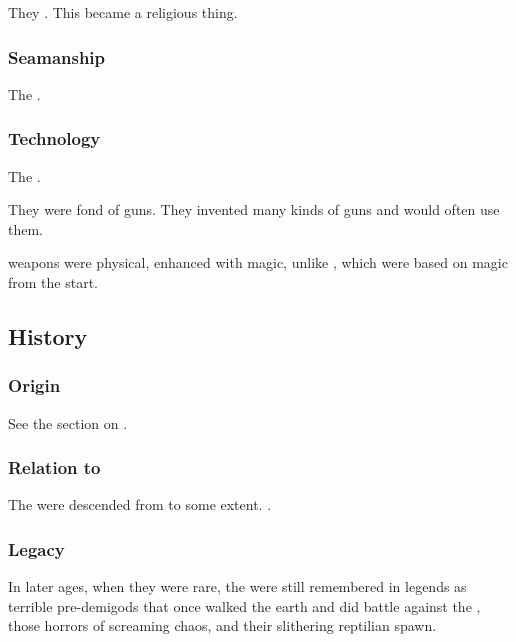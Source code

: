 They . 
This became a religious thing. 






\subsubsection{Seamanship}
The \aryothim{} . 





\subsubsection{Technology}
The \aryothim {}. 

They were fond of guns. 
They invented many kinds of guns and would often use them. 

\Aryoth{} weapons were physical, enhanced with magic, unlike , which were based on magic from the start. 









\subsection{History}





\subsubsection{Origin}
See the section on . 





\subsubsection{Relation to \resphain}
The \resphain were descended from \aryothim to some extent. 
.





\subsubsection{Legacy}
In later ages, when they were rare, the \aryothim were still remembered in legends as terrible pre-\human demigods that once walked the earth and did battle against the \dragons, those horrors of screaming chaos, and their slithering reptilian spawn. 










